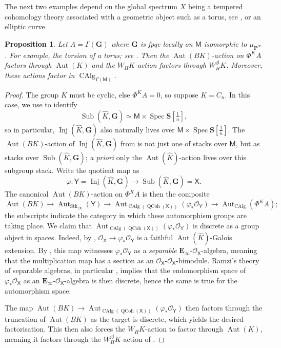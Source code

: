 \documentclass[11pt, a4paper]{article}
\newcommand{\gl}{\mathrm{gl}}
\DeclareMathOperator{\Spec}{Spec}
\newcommand{\1}{\mathbf{1}}
\newcommand{\Sph}{\mathbf{S}}
\DeclareMathOperator{\CAlg}{CAlg}
\DeclareMathOperator{\Inj}{Inj}
\DeclareMathOperator{\Sub}{Sub}
\DeclareMathOperator{\QCoh}{QCoh}
\DeclareMathOperator{\Stk}{Stk}
\DeclareMathOperator{\Aut}{Aut}
\newcommand{\dual}[1]{{\widehat{#1}}}
\newcommand{\E}{\mathbf{E}}
\newcommand{\G}{\mathbf{G}}
\newcommand{\M}{\mathsf{M}}
\renewcommand{\O}{\mathcal{O}}
\renewcommand{\P}{\mathbf{P}}
\newcommand{\X}{\mathsf{X}}
\newcommand{\Y}{\mathsf{Y}}
\newcommand{\Ga}{\Gamma}
\theoremstyle{plain}
\newtheorem{prop}[equation]{Proposition}
\theoremstyle{definition}
\theoremstyle{remark}\numberwithin{equation}{section}
\begin{document}
The next two examples depend on the global spectrum $X$ being a tempered cohomology theory associated with a geometric object such as a torus, see , or an elliptic curve.

\begin{prop}\label{pr:no_action_conflicts_part2_GM}
    Let $A=\Ga(\G)$ where $\G$ is fpqc locally on $\M$ isomorphic to $\mu_{\P^\infty}$. For example, the torsion of a torus; see . Then the $\Aut(BK)$-action on $\Phi^K A$ factors through $\Aut(K)$ and the $W_H K$-action factors through $W_H^\gl K$. Moreover, these actions factor in $\CAlg_{\Ga(\M)}$.
\end{prop}

\begin{proof}
    The group $K$ must be cyclic, else $\Phi^K A = 0$, so suppose $K=C_n$. In this case, we use  to identify
    \[\Sub(\dual{K}, \G) \simeq \M \times \Spec \Sph[\tfrac{1}{n}],\]
    so in particular, $\Inj(\dual{K}, \G)$ also naturally lives over $\M \times \Spec \Sph[\tfrac{1}{n}]$. The $\Aut(BK)$-action of $\Inj(\dual{K}, \G)$ from  is not just one of stacks over $\M$, but as stacks over $\Sub(\dual{K}, \G)$; \emph{a priori} only the $\Aut(\dual{K})$-action lives over this subgroup stack. Write the quotient map as
    \[\varphi \colon \Y = \Inj(\dual{K}, \G) \to \Sub(\dual{K}, \G) = \X.\]
    The canonical $\Aut(BK)$-action on $\Phi^K A$ is then the composite
    \[\Aut(BK) \to \Aut_{\Stk_{/\X}}(\Y) \to \Aut_{\CAlg(\QCoh(\X))}(\varphi_\ast \O_\Y) \to \Aut_{\CAlg}(\Phi^K A);\]
    the subscripts indicate the category in which these automorphism groups are taking place. We claim that $\Aut_{\CAlg(\QCoh(\X))}(\varphi_\ast \O_\Y)$ is discrete as a group object in spaces. Indeed, by , $\O_\X \to \varphi_\ast \O_\Y$ is a faithful $\Aut(\dual{K})$-Galois extension. By \cite[Lm.9.1.2]{johnrognessdualisinggorups}, this map witnesses $\varphi_\ast \O_\Y$ as a \emph{separable} $\E_\infty$-$\O_\X$-algebra, meaning that the multiplication map has a section as an $\O_\X$-$\O_\X$-bimodule. Ramzi's theory of separable algebras, in particular \cite[Cor.3.42]{ramzi_separability}, implies that the endomorphism space of $\varphi_\ast \O_\X$ as an $\E_\infty$-$\O_\X$-algebra is then discrete, hence the same is true for the automorphism space. 

    The map $\Aut(BK) \to \Aut_{\CAlg(\QCoh(\X))}(\varphi_\ast \O_\Y)$ then factors through the truncation of $\Aut(BK)$ as the target is discrete, which yields the desired factorisation. This then also forces the $W_H K$-action to factor through $\Aut(K)$, meaning it factors through the $W_H^\gl K$-action of .
\end{proof}
\end{document}
